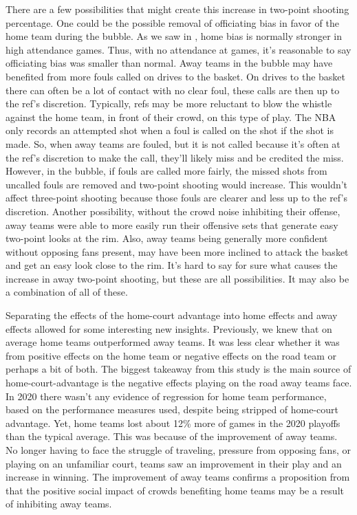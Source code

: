 \documentclass[10pt]{article}
\begin{document}
There are a few possibilities that might create this increase in two-point shooting
percentage. One could be the possible removal of officiating bias in favor of the 
home team during the bubble. As we saw in \citet{Price}, home bias is normally
stronger in high attendance games. Thus, with no attendance at games, it's reasonable
to say officiating bias was smaller than normal. Away teams in the bubble may have benefited from more 
fouls called on drives to the basket. On drives to the basket there can often be a 
lot of contact with no clear foul, these calls are then up to the ref's discretion.
Typically, refs may be more reluctant to blow the whistle against the home team, in
front of their crowd, on this type of play. The NBA only records an attempted shot 
when a foul is called on the shot if the shot is made. So, when away teams are 
fouled, but it is not called because it's often at the ref's discretion to make 
the call, they'll likely miss and be credited the miss. However, in the bubble, if
fouls are called more fairly, the missed shots from uncalled fouls are removed and 
two-point shooting would increase. This wouldn't affect three-point shooting because
those fouls are clearer and less up to the ref's discretion. Another possibility,
without the crowd noise inhibiting their offense, away teams were able to more 
easily run their offensive sets that generate easy two-point looks at the rim. 
Also, away teams being generally more confident without opposing fans present, 
may have been more inclined to attack the basket and get an easy look close to 
the rim. It's hard to say for sure what causes the increase in away two-point shooting,
but these are all possibilities. It may also be a combination of all of these. 


Separating the effects of the home-court advantage into home effects and away
effects allowed for some interesting new insights. Previously, we knew that on
average home teams outperformed away teams. It was less clear whether it was
from positive effects on the home team or negative effects on the road team or
perhaps a bit of both. The biggest takeaway from this study is the main source
of home-court-advantage is the negative effects playing on the road away teams
face. In 2020 there wasn't any evidence of regression for home team performance,
based on the performance measures used, despite being stripped of home-court
advantage. Yet, home teams lost about 12\% more of games in the 2020 playoffs
than the typical average. This was because of the improvement of away teams.
No longer having to face the struggle of traveling, pressure from opposing fans,
or playing on an unfamiliar court, teams saw an improvement in their play and an
increase in winning. The improvement of away teams confirms a proposition from
\citet{Greer} that the positive social impact of crowds benefiting
home teams may be a result of inhibiting away teams.
\end{document}
